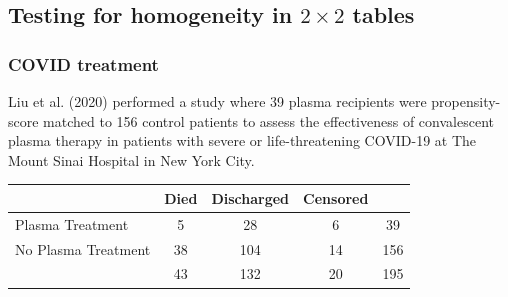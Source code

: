 \documentclass[a4paper]{article}
\begin{document}
\subsection{Testing for homogeneity in \texorpdfstring{\( 2 \times 2 \)}{2 x 2} tables}
\subsubsection{COVID treatment}
Liu et al. (2020) performed a study where 39 plasma recipients were propensity-score matched to 156 control patients to assess the effectiveness of convalescent plasma therapy in patients with severe or life-threatening COVID-19 at The Mount Sinai Hospital in New York City.
\begin{table}[H]
	\centering
	\begin{tabular}{@{}lcccc@{}}
	\toprule
						& Died & Discharged & Censored &     \\ \midrule
	Plasma Treatment    & 5    & 28         & 6        & 39  \\
	No Plasma Treatment & 38   & 104        & 14       & 156 \\ \midrule
						& 43   & 132        & 20       & 195 \\ \bottomrule
	\end{tabular}
\end{table}
\end{document}
